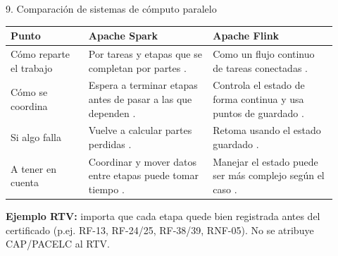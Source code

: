 \begin{frame}{9. Comparación de sistemas de cómputo paralelo}
  \begin{table}
    \centering
    \scriptsize
    \begin{tabular}{@{}p{0.22\linewidth}p{0.35\linewidth}p{0.35\linewidth}@{}}
      \toprule
      \textbf{Punto} & \textbf{Apache Spark} & \textbf{Apache Flink} \\
      \midrule
      Cómo reparte el trabajo & Por tareas y etapas que se completan por partes \cite{elhmadany2024,vandongen2021}. & Como un flujo continuo de tareas conectadas \cite{javed2023}. \\
      Cómo se coordina & Espera a terminar etapas antes de pasar a las que dependen \cite{elhmadany2024}. & Controla el estado de forma continua y usa puntos de guardado \cite{javed2023}. \\
      Si algo falla & Vuelve a calcular partes perdidas \cite{vandongen2021,javed2023}. & Retoma usando el estado guardado \cite{javed2023}. \\
      A tener en cuenta & Coordinar y mover datos entre etapas puede tomar tiempo \cite{mostafaei2022,elhmadany2024}. & Manejar el estado puede ser más complejo según el caso \cite{javed2023}. \\
      \bottomrule
    \end{tabular}
  \end{table}
  \vspace{0.2em}
  {\footnotesize \textbf{Ejemplo RTV:} importa que cada etapa quede bien registrada antes del certificado (p.ej. RF-13, RF-24/25, RF-38/39, RNF-05). No se atribuye CAP/PACELC al RTV.}
\end{frame}
